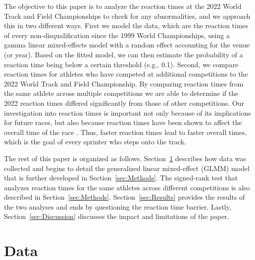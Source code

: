 \documentclass[12pt, letterpaper, titlepage]{article}
\begin{document}
The objective to this paper is to analyze the reaction times at the 2022 World 
Track and Field Championships to check for any abnormalities, and we approach
this in two different ways.  First we model the data, which are
the reaction times of every non-disqualification since the 1999 World 
Championships, using a gamma linear mixed-effects model with a random effect 
accounting for the venue (or year). 
Based on the fitted model, we can then estimate the probability of a reaction 
time being below a certain threshold (e.g., 0.1). 
Second, we compare reaction times for athletes who have competed
at additional competitions to the 2022 World Track and Field Championship.  By
comparing reaction times from the same athlete across multiple competitions we 
are able to determine if the 2022 reaction times differed significantly from 
those of other competitions.
Our investigation into reaction times is important not only because of its
implications for future races, but also because reaction times have
been shown to affect the overall time of the race \citep{delalija2008reaction}.
Thus, faster reaction times lead to faster overall times, which is the goal of
every sprinter who steps onto the track.



The rest of this paper is organized as follows. Section~\ref{sec:Data} describes 
how data was collected and begins to detail the generalized linear mixed-effect 
(GLMM) model that is further developed in Section~\ref{sec:Methods}. The 
signed-rank test that analyzes reaction times for the same athletes across
different competitions is
also described in Section~\ref{sec:Methods}.  Section~\ref{sec:Results}
 provides the results of the two analyses and ends 
by questioning the reaction time barrier.  Lastly, Section~\ref{sec:Discussion}
discusses the impact and limitations of the paper.


\section{Data} \label{sec:Data}
\end{document}
